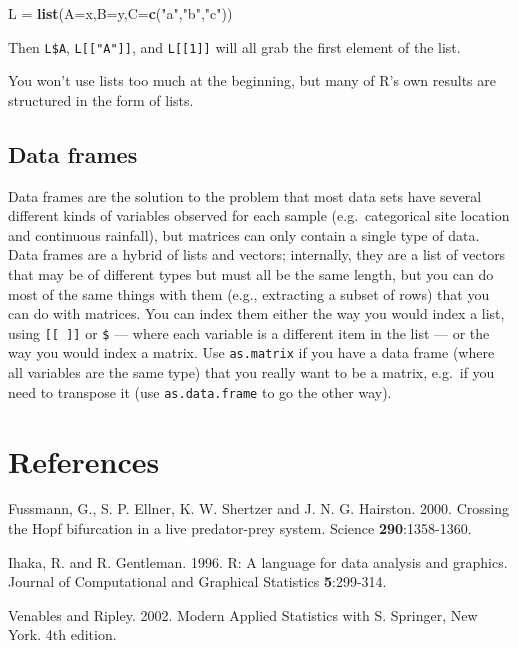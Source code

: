 \documentclass[11pt,]{article}
\newenvironment{Shaded}{\begin{snugshade}}{\end{snugshade}}
\newcommand{\KeywordTok}[1]{\textcolor[rgb]{0.13,0.29,0.53}{\textbf{#1}}}
\newcommand{\DataTypeTok}[1]{\textcolor[rgb]{0.13,0.29,0.53}{#1}}
\newcommand{\StringTok}[1]{\textcolor[rgb]{0.31,0.60,0.02}{#1}}
\newcommand{\NormalTok}[1]{#1}
\begin{document}
\begin{Shaded}
\begin{Highlighting}[]
\NormalTok{L =}\StringTok{ }\KeywordTok{list}\NormalTok{(}\DataTypeTok{A=}\NormalTok{x,}\DataTypeTok{B=}\NormalTok{y,}\DataTypeTok{C=}\KeywordTok{c}\NormalTok{(}\StringTok{"a"}\NormalTok{,}\StringTok{"b"}\NormalTok{,}\StringTok{"c"}\NormalTok{))}
\end{Highlighting}
\end{Shaded}

Then \texttt{L\$A}, \texttt{L{[}{[}"A"{]}{]}}, and
\texttt{L{[}{[}1{]}{]}} will all grab the first element of the list.

You won't use lists too much at the beginning, but many of R's own
results are structured in the form of lists.

\subsection{Data frames}\label{data-frames}

Data frames are the solution to the problem that most data sets have
several different kinds of variables observed for each sample
(e.g.~categorical site location and continuous rainfall), but matrices
can only contain a single type of data. Data frames are a hybrid of
lists and vectors; internally, they are a list of vectors that may be of
different types but must all be the same length, but you can do most of
the same things with them (e.g., extracting a subset of rows) that you
can do with matrices. You can index them either the way you would index
a list, using \texttt{{[}{[}\ {]}{]}} or \texttt{\$} --- where each
variable is a different item in the list --- or the way you would index
a matrix. Use \texttt{as.matrix} if you have a data frame (where all
variables are the same type) that you really want to be a matrix,
e.g.~if you need to transpose it (use \texttt{as.data.frame} to go the
other way).

\section{References}\label{references}

Fussmann, G., S. P. Ellner, K. W. Shertzer and J. N. G. Hairston. 2000.
Crossing the Hopf bifurcation in a live predator-prey system. Science
\textbf{290}:1358-1360.

Ihaka, R. and R. Gentleman. 1996. R: A language for data analysis and
graphics. Journal of Computational and Graphical Statistics
\textbf{5}:299-314.

Venables and Ripley. 2002. Modern Applied Statistics with S. Springer,
New York. 4th edition.
\end{document}
